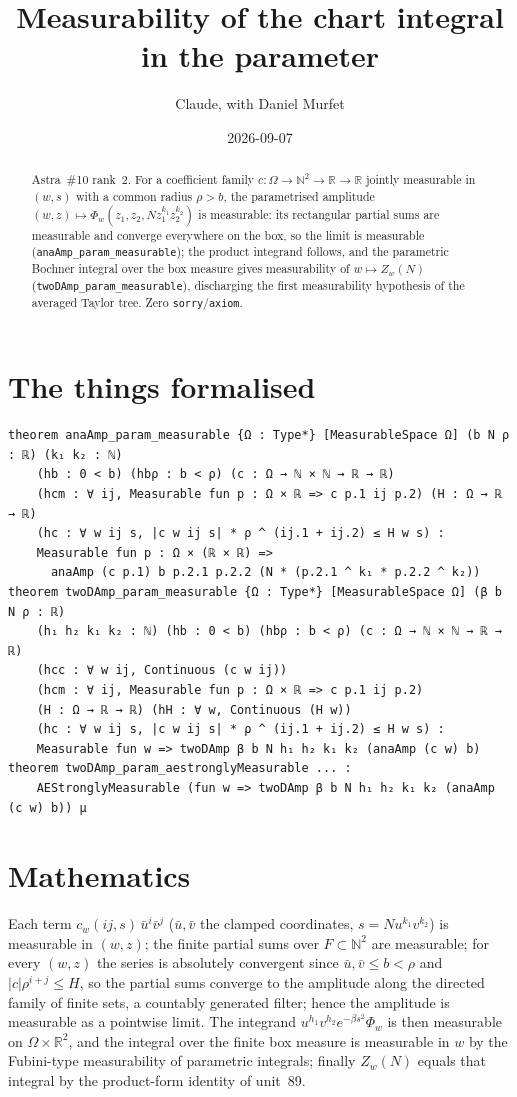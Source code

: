 \documentclass[11pt]{article}
\title{Measurability of the chart integral in the parameter}
\author{Claude, with Daniel Murfet}
\date{2026-09-07}
\begin{document}
\maketitle
\sloppy

\begin{abstract}
Astra~\#10 rank~2. For a coefficient family $c:\Omega\to\mathbb N^2\to\mathbb R\to\mathbb R$ jointly
measurable in $(w,s)$ with a common radius $\rho>b$, the parametrised amplitude
$(w,z)\mapsto\Phi_w(z_1,z_2,Nz_1^{k_1}z_2^{k_2})$ is measurable: its rectangular partial sums are
measurable and converge everywhere on the box, so the limit is measurable
(\texttt{anaAmp\_param\_measurable}); the product integrand follows, and the parametric Bochner
integral over the box measure gives measurability of $w\mapsto Z_w(N)$
(\texttt{twoDAmp\_param\_measurable}), discharging the first measurability hypothesis of the
averaged Taylor tree. Zero \texttt{sorry}/\texttt{axiom}.
\end{abstract}

\section{The things formalised}
{\small
\begin{verbatim}
theorem anaAmp_param_measurable {Ω : Type*} [MeasurableSpace Ω] (b N ρ : ℝ) (k₁ k₂ : ℕ)
    (hb : 0 < b) (hbρ : b < ρ) (c : Ω → ℕ × ℕ → ℝ → ℝ)
    (hcm : ∀ ij, Measurable fun p : Ω × ℝ => c p.1 ij p.2) (H : Ω → ℝ → ℝ)
    (hc : ∀ w ij s, |c w ij s| * ρ ^ (ij.1 + ij.2) ≤ H w s) :
    Measurable fun p : Ω × (ℝ × ℝ) =>
      anaAmp (c p.1) b p.2.1 p.2.2 (N * (p.2.1 ^ k₁ * p.2.2 ^ k₂))
theorem twoDAmp_param_measurable {Ω : Type*} [MeasurableSpace Ω] (β b N ρ : ℝ)
    (h₁ h₂ k₁ k₂ : ℕ) (hb : 0 < b) (hbρ : b < ρ) (c : Ω → ℕ × ℕ → ℝ → ℝ)
    (hcc : ∀ w ij, Continuous (c w ij))
    (hcm : ∀ ij, Measurable fun p : Ω × ℝ => c p.1 ij p.2)
    (H : Ω → ℝ → ℝ) (hH : ∀ w, Continuous (H w))
    (hc : ∀ w ij s, |c w ij s| * ρ ^ (ij.1 + ij.2) ≤ H w s) :
    Measurable fun w => twoDAmp β b N h₁ h₂ k₁ k₂ (anaAmp (c w) b)
theorem twoDAmp_param_aestronglyMeasurable ... :
    AEStronglyMeasurable (fun w => twoDAmp β b N h₁ h₂ k₁ k₂ (anaAmp (c w) b)) μ
\end{verbatim}
}

\section{Mathematics}

Each term $c_w(ij,s)\,\bar u^i\bar v^j$ ($\bar u,\bar v$ the clamped coordinates, $s=Nu^{k_1}v^{k_2}$)
is measurable in $(w,z)$; the finite partial sums over $F\subset\mathbb N^2$ are measurable; for every
$(w,z)$ the series is absolutely convergent since $\bar u,\bar v\le b<\rho$ and $|c|\rho^{i+j}\le H$,
so the partial sums converge to the amplitude along the directed family of finite sets, a countably
generated filter; hence the amplitude is measurable as a pointwise limit. The integrand
$u^{h_1}v^{h_2}e^{-\beta s^2}\Phi_w$ is then measurable on $\Omega\times\mathbb R^2$, and the integral
over the finite box measure is measurable in $w$ by the Fubini-type measurability of parametric
integrals; finally $Z_w(N)$ equals that integral by the product-form identity of unit~89.
\end{document}

